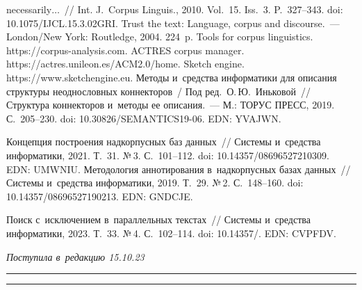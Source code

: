 \begin{multicols}{2}
{{\begin{thebibliography}{99}
necessarily$\ldots$~// Int. J.~Corpus Linguis., 2010. Vol.~15. Iss.~3. P.~327--343. doi: 
10.1075/\mbox{IJCL}.15.3.02GRI.
 Trust the text: Language, corpus and discourse.~--- London/New York: 
Routledge, 2004. 224~p.
Tools for corpus linguistics. {\sf https://corpus-analysis.com}.
ACTRES corpus manager. {\sf https://actres.unileon.\linebreak es/ACM2.0/home}.
Sketch engine. {\sf https://www.sketchengine.eu}.
 Методы и~средства информатики для 
описания структуры неоднословных коннекторов~/ Под ред.\ О.\,Ю.~Иньковой~// 
Структура коннекторов и~методы ее \mbox{описания}.~--- М.: ТОРУС ПРЕСС, 2019. С.~205--230. 
doi: 10.30826/SEMANTICS19-06. EDN: YVAJWN.

   Концепция построения надкорпусных баз данных~// Системы 
и~средства информатики, 2021. Т.~31. №\,3. С.~101--112. doi: 10.14357/08696527210309. 
EDN: UMWNIU.
 Методология аннотирования 
в~надкорпусных базах данных~// Системы и~средства информатики, 2019. Т.~29. №\,2. 
С.~148--160. doi: 10.14357/08696527190213. EDN: GNDCJE.


 Поиск с~исключением в~параллельных текстах~// Системы и~средства 
информатики, 2023. Т.~33. №\,4. С.~102--114.
doi: 10.14357\!/.  EDN: CVPFDV.
\end{thebibliography}

 }
 }

\end{multicols}

\vspace*{-10pt}

\hfill{\small\textit{Поступила в~редакцию 15.10.23}}

\vspace*{6pt}




\hrule

\vspace*{2pt}

\hrule



\def\tit{PARALLEL CORPUS ANNOTATION: APPROACHES AND~DIRECTIONS FOR~DEVELOPMENT}


